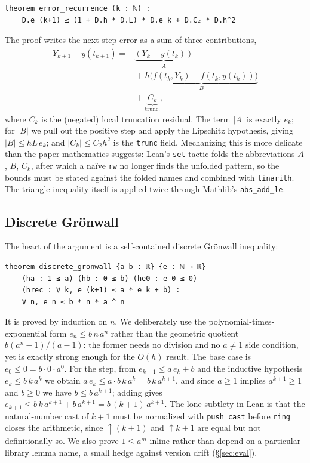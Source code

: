 \documentclass[sigplan,nonacm,screen,review]{acmart}
\begin{document}
\begin{lstlisting}[language=lean]
theorem error_recurrence (k : ℕ) :
    D.e (k+1) ≤ (1 + D.h * D.L) * D.e k + D.C₂ * D.h^2
\end{lstlisting}

The proof writes the next-step error as a sum of three contributions,
\[
\begin{aligned}
Y_{k+1} - y(t_{k+1}) = {}& \underbrace{(Y_k - y(t_k))}_{A}\\
  &{}+ \underbrace{h\big(f(t_k,Y_k) - f(t_k,y(t_k))\big)}_{B}\\
  &{}+ \underbrace{C_k}_{\text{trunc.}},
\end{aligned}
\]
where $C_k$ is the (negated) local truncation residual. The term $|A|$ is exactly
$e_k$; for $|B|$ we pull out the positive step and apply the Lipschitz hypothesis,
giving $|B| \le hL\,e_k$; and $|C_k| \le C_2 h^2$ is the \texttt{trunc} field.
Mechanizing this is more delicate than the paper mathematics suggests: Lean's
\lstinline[language=lean]|set| tactic folds the abbreviations $A$, $B$, $C_k$,
after which a na\"ive \lstinline[language=lean]|rw| no longer finds the unfolded
pattern, so the bounds must be stated against the folded names and combined with
\lstinline[language=lean]|linarith|. The triangle inequality itself is applied
twice through Mathlib's \lstinline[language=lean]|abs_add_le|.

\subsection{Discrete Grönwall}
The heart of the argument is a self-contained discrete Grönwall inequality:

\begin{lstlisting}[language=lean]
theorem discrete_gronwall {a b : ℝ} {e : ℕ → ℝ}
    (ha : 1 ≤ a) (hb : 0 ≤ b) (he0 : e 0 ≤ 0)
    (hrec : ∀ k, e (k+1) ≤ a * e k + b) :
    ∀ n, e n ≤ b * n * a ^ n
\end{lstlisting}

It is proved by induction on $n$. We deliberately use the
polynomial-times-exponential form $e_n \le b\,n\,a^n$ rather than the geometric
quotient $b(a^n - 1)/(a-1)$: the former needs no division and no $a \ne 1$ side
condition, yet is exactly strong enough for the $O(h)$ result. The base case is
$e_0 \le 0 = b\cdot 0\cdot a^0$. For the step, from
$e_{k+1} \le a\,e_k + b$ and the inductive hypothesis $e_k \le b\,k\,a^k$ we obtain
$a\,e_k \le a\cdot b\,k\,a^k = b\,k\,a^{k+1}$, and since $a \ge 1$ implies
$a^{k+1}\ge 1$ and $b \ge 0$ we have $b \le b\,a^{k+1}$; adding gives
$e_{k+1} \le b\,k\,a^{k+1} + b\,a^{k+1} = b\,(k+1)\,a^{k+1}$. The lone subtlety in
Lean is that the natural-number cast of $k+1$ must be normalized with
\lstinline[language=lean]|push_cast| before \lstinline[language=lean]|ring| closes
the arithmetic, since $\uparrow(k+1)$ and $\uparrow k + 1$ are equal but not
definitionally so. We also prove $1 \le a^m$ inline rather than depend on a
particular library lemma name, a small hedge against version drift
(\S\ref{sec:eval}).
\end{document}
